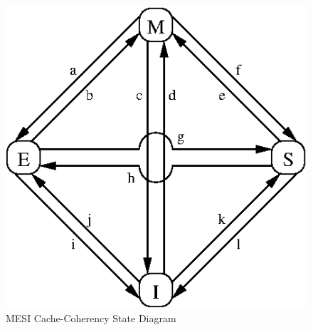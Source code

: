 \begin{figure}[htb]
\begin{center}
\includegraphics{appendix/whymb/MESI}
\end{center}
\caption{MESI Cache-Coherency State Diagram}
\label{fig:app:whymb:MESI Cache-Coherency State Diagram}
\end{figure}

